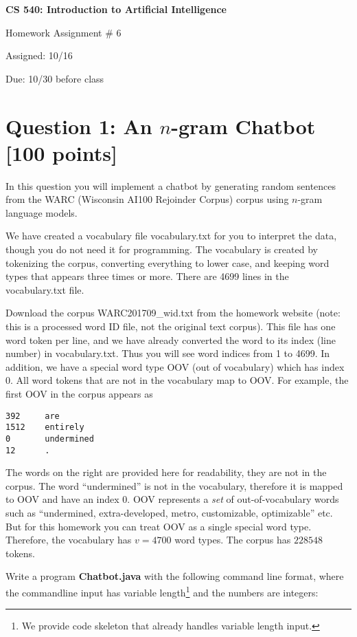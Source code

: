 \documentclass{article}
\begin{document}
\begin{center}
{\bf \large CS 540: Introduction to Artificial Intelligence

Homework Assignment \# 6

\vspace{0.5cm}

Assigned:  10/16 

Due:  10/30 before class} 
\end{center}

\section*{Question 1: An $n$-gram Chatbot [100 points]}
In this question you will implement a chatbot by generating random sentences from the WARC (Wisconsin AI100 Rejoinder Corpus) corpus using $n$-gram language models.

We have created a vocabulary file vocabulary.txt for you to interpret the data, though you do not need it for programming.
The vocabulary is created by tokenizing the corpus, converting everything to lower case, and keeping word types that appears three times or more.  There are 4699 lines in the vocabulary.txt file.  

Download the corpus WARC201709\_wid.txt from the homework website (note: this is a processed word ID file, not the original text corpus).  This file has one word token per line, and we have already converted the word to its index (line number) in vocabulary.txt.
Thus you will see word indices from 1 to 4699.  In addition, we have a special word type OOV (out of vocabulary) which has index 0.  All word tokens that are not in the vocabulary map to OOV.  
For example, the first OOV in the corpus appears as
\begin{verbatim}
392     are
1512    entirely
0       undermined
12      .
\end{verbatim}
The words on the right are provided here for readability, they are not in the corpus.  The word ``undermined'' is not in the vocabulary, therefore it is mapped to OOV and have an index 0.
OOV represents a \emph{set} of out-of-vocabulary words such as 
``undermined,
extra-developed,
metro,
customizable,
optimizable'' etc.  But for this homework you can treat OOV as a single special word type.
Therefore, the vocabulary has $v=4700$ word types.
The corpus has $228548$ tokens.

Write a program \textbf{Chatbot.java} with the following command line format, where the commandline input has variable length\footnote{We provide code skeleton that already handles variable length input.} and the numbers are integers:
\end{document}

